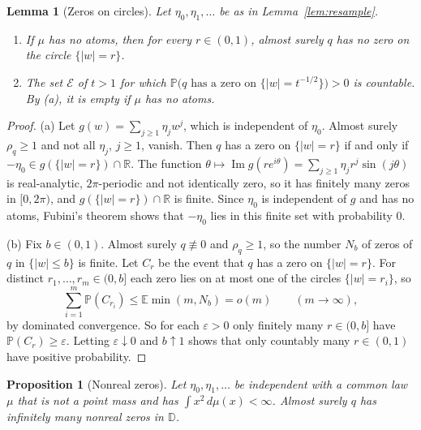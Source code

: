 \documentclass[11pt]{amsart}
\newtheorem{proposition}[theorem]{Proposition}
\newtheorem{lemma}[theorem]{Lemma}
\theoremstyle{definition}
\theoremstyle{remark}
\numberwithin{equation}{section}
\newcommand{\R}{\mathbb{R}}
\newcommand{\D}{\mathbb{D}}
\newcommand{\E}{\mathbb{E}}
\newcommand{\PP}{\mathbb{P}}
\newcommand{\eps}{\varepsilon}
\DeclareMathOperator{\im}{Im}
\begin{document}
\begin{lemma}[Zeros on circles]\label{lem:circle}
Let $\eta_0,\eta_1,\dots$ be as in Lemma~\ref{lem:resample}.
\begin{enumerate}
\item[(a)] If $\mu$ has no atoms, then for every $r\in(0,1)$, almost surely $q$ has no zero on the circle $\{|w|=r\}$.
\item[(b)] The set $\mathcal E$ of $t>1$ for which $\PP\bigl(q\text{ has a zero on }\{|w|=t^{-1/2}\}\bigr)>0$ is countable. By (a), it is empty if $\mu$ has no atoms.
\end{enumerate}
\end{lemma}

\begin{proof}
(a) Let $g(w)=\sum_{j\ge1}\eta_jw^j$, which is independent of $\eta_0$. Almost surely $\rho_q\ge1$ and not all $\eta_j$, $j\ge1$, vanish. Then $q$ has a zero on $\{|w|=r\}$ if and only if $-\eta_0\in g(\{|w|=r\})\cap\R$. The function $\theta\mapsto\im g(re^{i\theta})=\sum_{j\ge1}\eta_jr^j\sin(j\theta)$ is real-analytic, $2\pi$-periodic and not identically zero, so it has finitely many zeros in $[0,2\pi)$, and $g(\{|w|=r\})\cap\R$ is finite. Since $\eta_0$ is independent of $g$ and has no atoms, Fubini's theorem shows that $-\eta_0$ lies in this finite set with probability $0$.

(b) Fix $b\in(0,1)$. Almost surely $q\not\equiv0$ and $\rho_q\ge1$, so the number $N_b$ of zeros of $q$ in $\{|w|\le b\}$ is finite. Let $C_r$ be the event that $q$ has a zero on $\{|w|=r\}$. For distinct $r_1,\dots,r_m\in(0,b]$ each zero lies on at most one of the circles $\{|w|=r_i\}$, so
\[
\sum_{i=1}^m\PP(C_{r_i})\le\E\min(m,N_b)=o(m)\qquad(m\to\infty),
\]
by dominated convergence. So for each $\eps>0$ only finitely many $r\in(0,b]$ have $\PP(C_r)\ge\eps$. Letting $\eps\downarrow0$ and $b\uparrow1$ shows that only countably many $r\in(0,1)$ have positive probability.
\end{proof}

\begin{proposition}[Nonreal zeros]\label{prop:nonreal}
Let $\eta_0,\eta_1,\dots$ be independent with a common law $\mu$ that is not a point mass and has $\int x^2\,d\mu(x)<\infty$. Almost surely $q$ has infinitely many nonreal zeros in $\D$.
\end{proposition}
\end{document}
